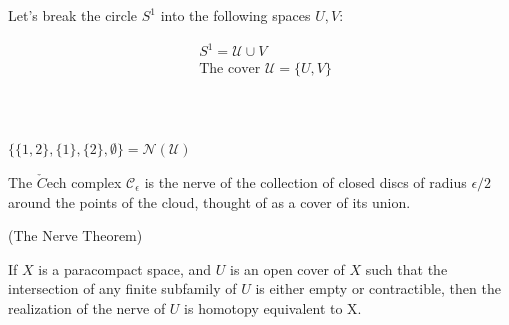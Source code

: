 \documentclass[11pt,a4paper]{report}
\begin{document}
              \begin{Ex} Let's break the circle $S^1$ into the following spaces $U, V$: \\
              \begin{center}
            \end{center}
               \begin{align*}
                &S^1 = \mathcal{U} \cup V\\
                &\textrm{The cover } \mathcal{U} = \{U, V\}\\
              \end{align*}
              \\
              \\
              $\{\{1, 2\}, \{1\},\{2\}, \emptyset\} = \mathcal{N}(\mathcal{U})$\\
              \end{Ex}

              
              The $\check{C}$ech complex $\mathcal{C}_\epsilon$ is the nerve of the collection of closed discs of radius $\epsilon/2$ around the points of the cloud, thought of as a cover of its union.
              \begin{thm}(The Nerve Theorem)
              
            If $X$ is a paracompact space, and $U$ is an open cover of $X$ such that the
            intersection of any finite subfamily of $U$ is either empty or contractible,
            then the realization of the nerve of $U$ is homotopy equivalent to X.\cite{hatcher}
            
              \end{thm}
\end{document}
